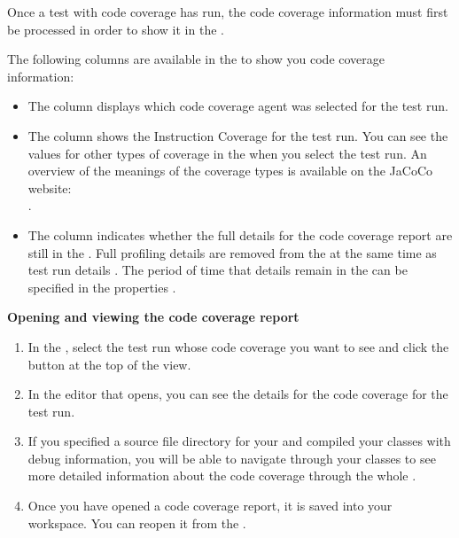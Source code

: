 Once a test with code coverage has run, the  code coverage information must first be processed in order to show it in the \gdtestsummaryview{}. 

The following columns are available in the \gdtestsummaryview{} to show you code coverage information:


\begin{itemize}
\item The  column displays which code coverage agent was selected for the test run.
\item The  column shows the Instruction Coverage for the test run. You can see the values for other types of coverage in the \gdpropview{} when you select the test run. An overview of the meanings of the coverage types is available on the JaCoCo website: \\
. 
\item The  column indicates whether the full details for the code coverage report are still in the \gddb{}. Full profiling details are removed from the \gddb{} at the same time as test run details . The period of time that details remain in the \gddb{} can be specified in the \gdproject{} properties .
\end{itemize}

\textbf{Opening and viewing the code coverage report}\\

\begin{enumerate}
\item In the \gdtestsummaryview{}, select the test run whose code coverage you want to see and click the  button at the top of the view. 
\item In the editor that opens, you can see the details for the code coverage for the test run. 
\item If you specified a source file directory for your \gdaut{}  and compiled your \gdaut{} classes with debug information, you will be able to navigate through your classes to see more detailed information about the code coverage through the whole \gdaut{}. 
\item Once you have opened a code coverage report, it is saved into your workspace. You can reopen it from the \gdnavview{}. 
\end{enumerate}




